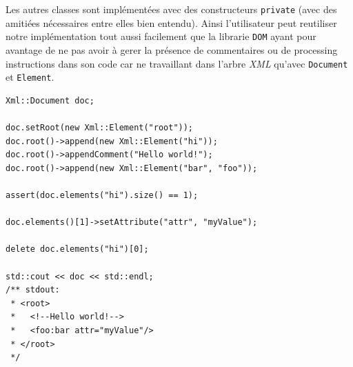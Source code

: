     Les autres classes sont impl\'ement\'ees avec des constructeurs \lstinline$private$ (avec des amiti\'ees n\'ecessaires entre elles bien entendu). Ainsi l'utilisateur peut reutiliser notre impl\'ementation tout aussi facilement que la librarie \lstinline$DOM$ ayant pour avantage de ne pas avoir \`a gerer la pr\'esence de commentaires ou de processing instructions dans son code car ne travaillant dans l'arbre \textit{XML} qu'avec \lstinline$Document$ et \lstinline$Element$.
    \\
    \begin{lstlisting}[frame=single]
Xml::Document doc;

doc.setRoot(new Xml::Element("root"));
doc.root()->append(new Xml::Element("hi"));
doc.root()->appendComment("Hello world!");
doc.root()->append(new Xml::Element("bar", "foo"));

assert(doc.elements("hi").size() == 1);

doc.elements()[1]->setAttribute("attr", "myValue");

delete doc.elements("hi")[0];

std::cout << doc << std::endl;
/** stdout:
 * <root>
 *   <!--Hello world!-->
 *   <foo:bar attr="myValue"/>
 * </root>
 */
    \end{lstlisting}

